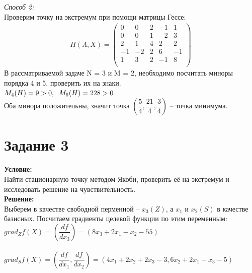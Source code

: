 \documentclass[14pt,a4paper,fleqn]{extarticle}
\begin{document}
	\textit{Способ 2:}\\
	Проверим точку на экстремум при помощи матрицы Гессе:
	\begin{align*}
		H(\Lambda, X) = \begin{pmatrix}
			0 & 0 & 2 & -1 & 1\\
			0 & 0 & 1 & -2 & 3\\
			2 & 1 & 4 & 2 & 2\\
			-1 & -2 & 2 & 6 & -1\\
			1 & 3 & 2 & -1 & 8\\
		\end{pmatrix}
	\end{align*}
	В рассматриваемой задаче N = 3 и M = 2, необходимо посчитать миноры порядка 4 и 5, проверить их на знаки.\\
	
	$M_4(H) = 9 > 0, \hspace*{0.2cm} M_5(H) = 228 > 0$\\
	Оба минора положительны, значит точка $(\dfrac{5}{4}, \dfrac{21}{4}, \dfrac{3}{4})$ -- точка минимума.
	
	\newpage
	\section*{Задание 3}
	\textbf{Условие:}\\
	Найти стационарную точку методом Якоби, проверить её на экстремум и исследовать решение на чувствительность.\\
	
	\textbf{Решение:}\\
	Выберем в качестве свободной перменной -- $x_3 (Z)$, а $x_1$ и $x_2 (S)$ в качестве базисных. Посчитаем градиенты целевой функции по этим переменным:\\
	$grad_Z f(X) = (\dfrac{df}{dx_3}) = (8x_3 + 2x_1 - x_2 - 55)$\\\\
	$grad_S f(X) = (\dfrac{df}{dx_1}, \dfrac{df}{dx_2}) = (4x_1 + 2x_2 + 2x_3 - 3, 6x_2 + 2x_1 - x_3 - 5)$\\
	
\end{document}
